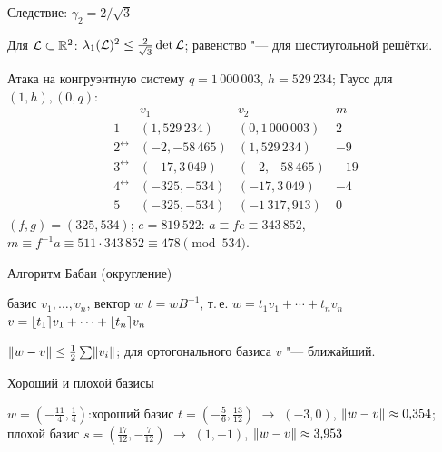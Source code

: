 \documentclass{ca-slides}
\begin{document}
\begin{canvasframe}{Следствие: $\gamma_2 = 2/\sqrt3$}
  \begin{corollary}
    Для $\mathcal{L} \subset \mathbb{R}^2$: $\lambda_1(\mathcal{L})^2 \le \frac{2}{\sqrt3}\det \mathcal{L}$; равенство "---
    для шестиугольной решётки.
  \end{corollary}
  \proofarea[0.3\textheight]
\end{canvasframe}

\begin{canvasframe}[shrink=5]{Атака на конгруэнтную систему}
  $q = 1\,000\,003$, $h = 529\,234$; Гаусс для $(1, h), (0, q)$:
  \[
  \begin{array}{c|r|r|r}
   & v_1 & v_2 & m \\ \hline
  1 & (1, 529\,234) & (0, 1\,000\,003) & 2 \\
  2^{\leftrightarrow} & (-2, -58\,465) & (1, 529\,234) & -9 \\
  3^{\leftrightarrow} & (-17, 3\,049) & (-2, -58\,465) & -19 \\
  4^{\leftrightarrow} & (-325, -534) & (-17, 3\,049) & -4 \\
  5 & (-325, -534) & (-1\,317, 913) & 0
  \end{array}
  \]
  $(f, g) = (325, 534)$; $e = 819\,522$: $a \equiv fe \equiv 343\,852$,
  $m \equiv f^{-1} a \equiv 511 \cdot 343\,852 \equiv 478 \pmod{534}$.
\end{canvasframe}

\begin{canvasframe}{Алгоритм Бабаи (округление)}
  \begin{algorithmic}[1]
    \Require базис $v_1, \dots, v_n$, вектор $w$
    \State $t = wB^{-1}$, т.\,е. $w = t_1 v_1 + \cdots + t_n v_n$
    \State \Return $v = \lfloor t_1\rceil v_1 + \cdots + \lfloor t_n\rceil v_n$
  \end{algorithmic}
  \begin{proposition}
    $\lVert w - v\rVert \le \frac12 \sum \lVert v_i\rVert$; для ортогонального базиса $v$ "--- ближайший.
  \end{proposition}
  \proofarea[0.15\textheight]
\end{canvasframe}

\begin{canvasframe}{Хороший и плохой базисы}
  \centering
  \qquad
  \par\raggedright
  $w = (-\frac{11}{4}, \frac14)$:\quad хороший базис $t = (-\frac56, \frac{13}{12})$ $\to$
  $(-3, 0)$, $\lVert w - v\rVert \approx 0{,}354$;\\
  \quad плохой базис $s = (\frac{17}{12}, -\frac{7}{12})$ $\to$
  $(1, -1)$, $\lVert w - v\rVert \approx 3{,}953$
\end{canvasframe}
\end{document}
